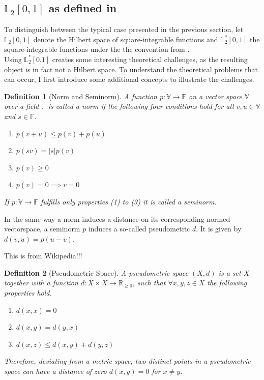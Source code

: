 \documentclass[12pt, a4paper]{article}
\theoremstyle{MAstyle} \newtheorem{assumption}{Assumption}[section]
\theoremstyle{MAstyle} \newtheorem{definition}{Definition}[section]
\theoremstyle{MAstyle} \newtheorem{theorem}{Theorem}[section]
\begin{document}
		\subsection{$\mathbb{L}_2[0,1]$ as defined in \cite{bugni_permutation_2021}}\label{deviation}
		To distinguish between the typical case presented in the previous section, let $\mathbb{L}_2[0,1]$ denote the Hilbert space of square-integrable functions and $\mathbb{L}^{*}_2[0,1]$ the square-integrable functions under the the convention from \cite{bugni_permutation_2021}.\\
		
		Using $\mathbb{L}^{*}_2[0.1]$ creates some interesting theoretical challenges, as the resulting object is in fact not a Hilbert space. To understand the theoretical problems that can occur, I first introduce some additional concepts to illustrate the challenges.
		\begin{definition}[Norm and Seminorm]
			A function $p : \mathbb{V} \rightarrow \mathbb{F}$ on a vector space $\mathbb{V}$ over a field $\mathbb{F}$ is called a norm if the following four conditions hold for all $v,u \in \mathbb{V}$ and $s \in \mathbb{F}$.
			\begin{multicols}{2}
				\begin{enumerate}
					\item $p(v + u) \leq p(v) + p(u)$
					\item $p(sv) = |s| p(v)$
					\item $p(v) \geq 0$
					\item $p(v) = 0 \implies v = 0$
				\end{enumerate}
			\end{multicols}
			If $p : \mathbb{V} \rightarrow \mathbb{F}$ fulfills only properties (1) to (3) it is called a seminorm.
		\end{definition}
		
		In the same way a norm induces a distance on its corresponding normed vectorspace, a seminorm $p$ induces a so-called pseudometric $d$. It is given by $d(v,u) = p(u-v)$.
		
		{\color{red} This is from Wikipedia!!!}
		\begin{definition}[Pseudometric Space]
			A pseudometric space $\left(X, d\right)$ is a set $X$ together with a function $d:X\times X \rightarrow \mathbb{R}_{\geq 0}$, such that $\forall x,y,z \in X$ the following properties hold.
			\begin{multicols}{2}
				\begin{enumerate}
					\item $d(x,x) = 0$
					\item $d(x,y) = d(y,x)$
					\item $d(x,z) \leq d(x,y) + d(y,z)$
				\end{enumerate}
			\end{multicols}
			Therefore, deviating from a metric space, two distinct points in a pseudometric space can have a distance of zero $d(x,y) = 0$ for $x \neq y$.
		\end{definition}
		
\end{document}
